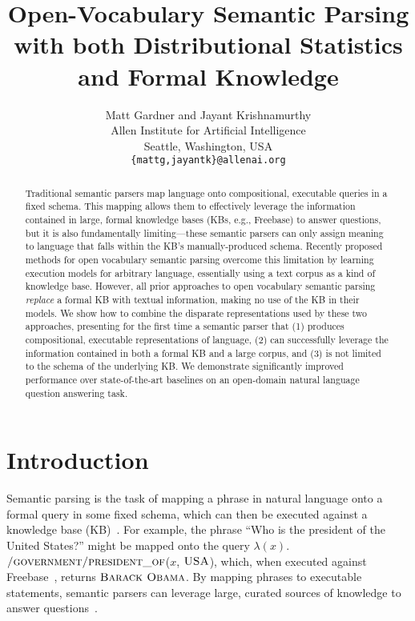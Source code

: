 \documentclass[11pt,letterpaper]{article}
\title{Open-Vocabulary Semantic Parsing\\with both Distributional
Statistics and Formal Knowledge}
\author{Matt Gardner and Jayant Krishnamurthy\\
Allen Institute for Artificial Intelligence\\
Seattle, Washington, USA\\
{\tt \{mattg,jayantk\}@allenai.org}}
\date{}
\newcommand{\formalpredicate}[1]{{\small \ensuremath{\textsc{#1}}}}
\begin{document}
\maketitle

\begin{abstract}

  Traditional semantic parsers map language onto compositional, executable queries in a fixed
  schema.  This mapping allows them to effectively leverage the information contained in large,
  formal knowledge bases (KBs, e.g., Freebase) to answer questions, but it is also fundamentally
  limiting---these semantic parsers can only assign meaning to language that falls within the KB's
  manually-produced schema.  Recently proposed methods for open vocabulary semantic parsing
  overcome this limitation by learning execution models for arbitrary language, essentially using a
  text corpus as a kind of knowledge base.  However, all prior approaches to open vocabulary
  semantic parsing \emph{replace} a formal KB with textual information, making no use of the KB in
  their models.  We show how to combine the disparate representations used by these two approaches,
  presenting for the first time a semantic parser that (1) produces compositional, executable
  representations of language, (2) can successfully leverage the information contained in both a
  formal KB and a large corpus, and (3) is not limited to the schema of the underlying KB.  We
  demonstrate significantly improved performance over state-of-the-art baselines on an open-domain
  natural language question answering task.

\end{abstract}

\section{Introduction}

Semantic parsing is the task of mapping a phrase in natural language onto a formal query in some
fixed schema, which can then be executed against a knowledge
base (KB)~\cite{zelle-1996-geoquery,zettlemoyer-2005-ccg}.  For example, the phrase ``Who is the
president of the United States?'' might be mapped onto the query
$\lambda(x).$\formalpredicate{/government/president\_of}($x$, \formalpredicate{USA}), which, when
executed against Freebase~\cite{freebase-2008-bollacker}, returns \formalpredicate{Barack Obama}.
By mapping phrases to executable statements, semantic parsers can leverage large, curated sources
of knowledge to answer questions~\cite{berant-2013-semantic-parsing-qa}.
\end{document}
